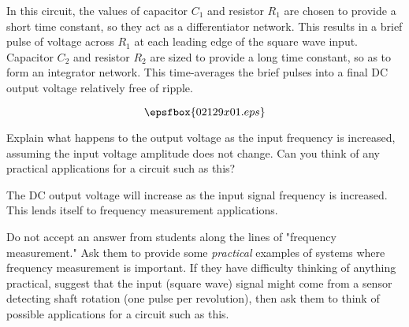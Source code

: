 

In this circuit, the values of capacitor $C_1$ and resistor $R_1$ are chosen to provide a short time constant, so they act as a differentiator network.  This results in a brief pulse of voltage across $R_1$ at each leading edge of the square wave input.  Capacitor $C_2$ and resistor $R_2$ are sized to provide a long time constant, so as to form an integrator network.  This time-averages the brief pulses into a final DC output voltage relatively free of ripple.

$$\epsfbox{02129x01.eps}$$

Explain what happens to the output voltage as the input frequency is increased, assuming the input voltage amplitude does not change.  Can you think of any practical applications for a circuit such as this?







The DC output voltage will increase as the input signal frequency is increased.  This lends itself to frequency measurement applications.







Do not accept an answer from students along the lines of "frequency measurement."  Ask them to provide some {\it practical} examples of systems where frequency measurement is important.  If they have difficulty thinking of anything practical, suggest that the input (square wave) signal might come from a sensor detecting shaft rotation (one pulse per revolution), then ask them to think of possible applications for a circuit such as this.




